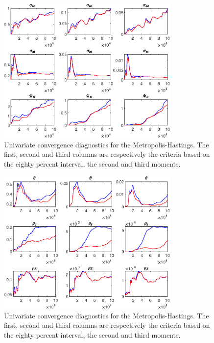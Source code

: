\begin{figure}[H]
\centering 
\includegraphics[width=0.80\textwidth]{BRS_sectoral/Output/BRS_sectoral_udiag9}
\caption{Univariate convergence diagnostics for the Metropolis-Hastings.
The first, second and third columns are respectively the criteria based on
the eighty percent interval, the second and third moments.}\label{Fig:UnivariateDiagnostics:9}
\end{figure}

\begin{figure}[H]
\centering 
\includegraphics[width=0.80\textwidth]{BRS_sectoral/Output/BRS_sectoral_udiag10}
\caption{Univariate convergence diagnostics for the Metropolis-Hastings.
The first, second and third columns are respectively the criteria based on
the eighty percent interval, the second and third moments.}\label{Fig:UnivariateDiagnostics:10}
\end{figure}

